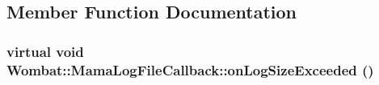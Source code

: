 \subsection{Member Function Documentation}
\hypertarget{classWombat_1_1MamaLogFileCallback_aeab41e1f482f6aa501d81eff1733137f}{
\subsubsection[{onLogSizeExceeded}]{\setlength{\rightskip}{0pt plus 5cm}virtual void Wombat::MamaLogFileCallback::onLogSizeExceeded ()}}
\label{classWombat_1_1MamaLogFileCallback_aeab41e1f482f6aa501d81eff1733137f}
